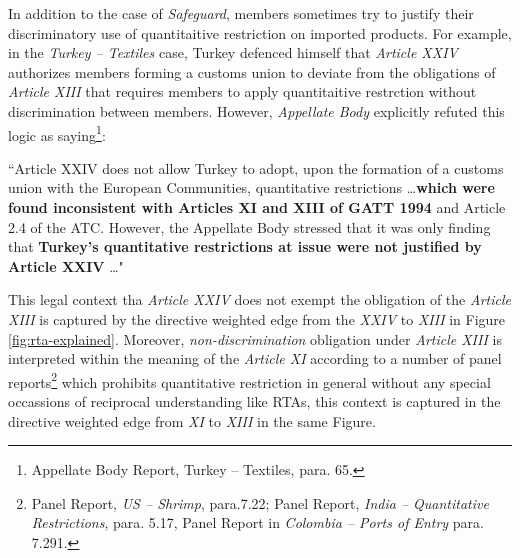 In addition to the case of \textit{Safeguard}, 
members sometimes try to justify their discriminatory 
use of quantitaitive restriction on imported products. For example, in the \textit{Turkey – Textiles} case, Turkey defenced himself that \textit{Article XXIV} authorizes
members forming a customs union to deviate from the obligations of \textit{Article XIII} that requires members to apply quantitaitive restrction without discrimination between members. 
However, \textit{Appellate Body} explicitly refuted this logic as saying\footnote{Appellate Body Report, Turkey – Textiles, para. 65.}:
\begin{displayquote}[][]
    ``Article XXIV does not allow Turkey to adopt, upon the
    formation of a customs union with the European Communities, quantitative restrictions \ldots \textbf{which
    were found inconsistent with Articles XI and XIII of GATT 1994} and Article 2.4 of the ATC.
    However, the Appellate Body stressed that it was only finding that \textbf{Turkey's quantitative
    restrictions at issue were not justified by Article XXIV} \ldots"
\end{displayquote}
This legal context tha \textit{Article XXIV} does not exempt the obligation of the \textit{Article XIII} is captured by the directive weighted edge from the \textit{XXIV} to \textit{XIII} in Figure \ref{fig:rta-explained}.
Moreover, \textit{non-discrimination} obligation under \textit{Article XIII} is interpreted within the meaning of the \textit{Article XI} according to a number of panel reports\footnote{Panel Report, \textit{US – Shrimp}, para.7.22;  Panel Report, \textit{India – Quantitative Restrictions}, para. 5.17, Panel Report in \textit{Colombia – Ports of Entry} para. 7.291.  } which prohibits quantitative restriction in general without any special occassions of reciprocal understanding like RTAs,
this context is captured in the directive weighted edge from \textit{XI} to \textit{XIII} in the same Figure.  